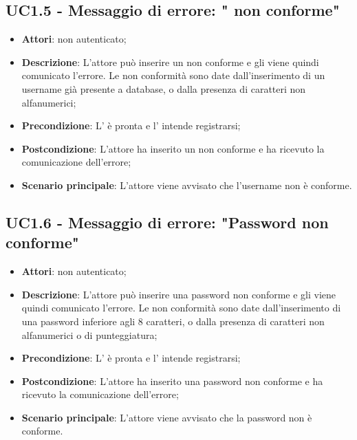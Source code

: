 \subsection{UC1.5 - Messaggio di errore: " non conforme"}
\label{ssec:UC1.5}
\begin{itemize}
\item \textbf{Attori}:  non autenticato;
\item \textbf{Descrizione}: L'attore può inserire un  non conforme e gli viene quindi comunicato l'errore. Le non conformità sono date dall'inserimento di un username già presente a database, o dalla presenza di caratteri non alfanumerici;
\item \textbf{Precondizione}: L' è pronta e l' intende registrarsi;
\item \textbf{Postcondizione}: L'attore ha inserito un  non conforme e ha ricevuto la comunicazione dell'errore;
\item \textbf{Scenario principale}: L'attore viene avvisato che l'username non è conforme.
\end{itemize}
\subsection{UC1.6 - Messaggio di errore: "Password non conforme"}
\label{ssec:UC1.6}
\begin{itemize}
\item \textbf{Attori}:  non autenticato;
\item \textbf{Descrizione}: L'attore può inserire una password non conforme e gli viene quindi comunicato l'errore. Le non conformità sono date dall'inserimento di una password inferiore agli 8 caratteri, o dalla presenza di caratteri non alfanumerici o di punteggiatura;
\item \textbf{Precondizione}: L' è pronta e l' intende registrarsi;
\item \textbf{Postcondizione}: L'attore ha inserito una password non conforme e ha ricevuto la comunicazione dell'errore;
\item \textbf{Scenario principale}: L'attore viene avvisato che la password non è conforme.
\end{itemize}

